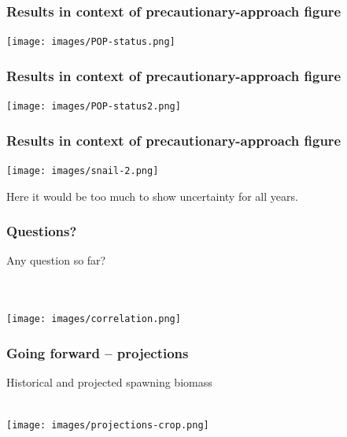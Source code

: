 \begin{frame}
\frametitle{Results in context of precautionary-approach figure}

\centering
\texttt{[image: images/POP-status.png]}

\end{frame}


\begin{frame}
\frametitle{Results in context of precautionary-approach figure}

\centering
\texttt{[image: images/POP-status2.png]}

\end{frame}


\begin{frame}
\frametitle{Results in context of precautionary-approach figure}

\centering
\texttt{[image: images/snail-2.png]}

Here it would be too much to show uncertainty for \alert{all} years.

\end{frame}


\begin{frame}

\frametitle{Questions?}

Any question so far?

\pause

~\\

~\\

\texttt{[image: images/correlation.png]}

\end{frame}


\begin{frame}
\frametitle{Going forward -- projections}

\bc
Historical and projected spawning biomass

~\\

\texttt{[image: images/projections-crop.png]}
\ec

\end{frame}


